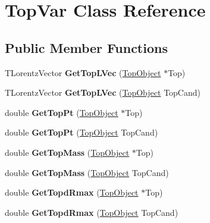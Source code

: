\hypertarget{classTopVar}{\section{Top\-Var Class Reference}
\label{classTopVar}
}
\subsection*{Public Member Functions}
\begin{DoxyCompactItemize}
\item 
\hypertarget{classTopVar_a3a9cb162c47eb50d5bf7da092f171ab9}{T\-Lorentz\-Vector {\bfseries Get\-Top\-L\-Vec} (\hyperlink{classTopObject}{Top\-Object} $\ast$Top)}\label{classTopVar_a3a9cb162c47eb50d5bf7da092f171ab9}

\item 
\hypertarget{classTopVar_a3bb45afff266a885ab16f78e0060211d}{T\-Lorentz\-Vector {\bfseries Get\-Top\-L\-Vec} (\hyperlink{classTopObject}{Top\-Object} Top\-Cand)}\label{classTopVar_a3bb45afff266a885ab16f78e0060211d}

\item 
\hypertarget{classTopVar_adb48bf6c18b1c1fbc3564eb84fcb3565}{double {\bfseries Get\-Top\-Pt} (\hyperlink{classTopObject}{Top\-Object} $\ast$Top)}\label{classTopVar_adb48bf6c18b1c1fbc3564eb84fcb3565}

\item 
\hypertarget{classTopVar_a3207bc1e6344587906bef719bef8a012}{double {\bfseries Get\-Top\-Pt} (\hyperlink{classTopObject}{Top\-Object} Top\-Cand)}\label{classTopVar_a3207bc1e6344587906bef719bef8a012}

\item 
\hypertarget{classTopVar_ac802702d527c3336dc8be6e2be115fe3}{double {\bfseries Get\-Top\-Mass} (\hyperlink{classTopObject}{Top\-Object} $\ast$Top)}\label{classTopVar_ac802702d527c3336dc8be6e2be115fe3}

\item 
\hypertarget{classTopVar_a5df90ebf342243ee33e6cb9574f13d21}{double {\bfseries Get\-Top\-Mass} (\hyperlink{classTopObject}{Top\-Object} Top\-Cand)}\label{classTopVar_a5df90ebf342243ee33e6cb9574f13d21}

\item 
\hypertarget{classTopVar_a5a2809ef2b8067a32a06d006fa96c2fe}{double {\bfseries Get\-Topd\-Rmax} (\hyperlink{classTopObject}{Top\-Object} $\ast$Top)}\label{classTopVar_a5a2809ef2b8067a32a06d006fa96c2fe}

\item 
\hypertarget{classTopVar_a2f28a0354e66d55403187fe5f3691ed4}{double {\bfseries Get\-Topd\-Rmax} (\hyperlink{classTopObject}{Top\-Object} Top\-Cand)}\label{classTopVar_a2f28a0354e66d55403187fe5f3691ed4}


\end{DoxyCompactItemize}
